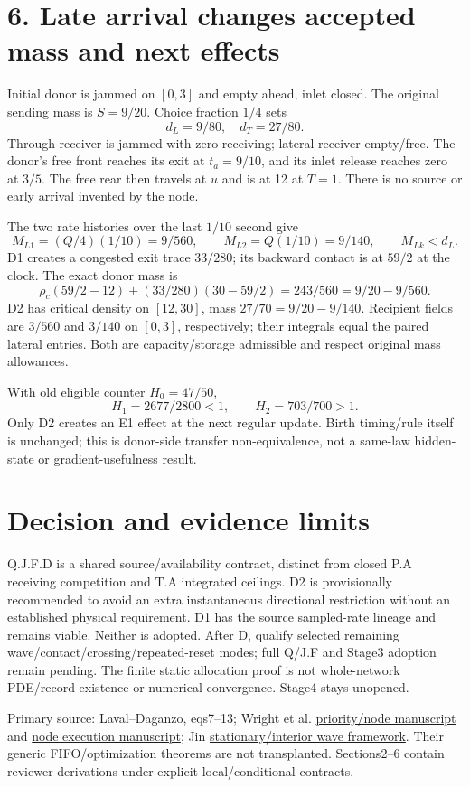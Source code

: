 \documentclass[11pt,a4paper]{article}
\begin{document}
\newpage
\section*{6. Late arrival changes accepted mass and next effects}
Initial donor is jammed on $[0,3]$ and empty ahead, inlet closed. The original
sending mass is $S=9/20$. Choice fraction $1/4$ sets
\begin{equation}
 d_L=9/80,\quad d_T=27/80.
\end{equation}
Through receiver is jammed with zero receiving; lateral receiver empty/free.
The donor's free front reaches its exit at $t_a=9/10$, and its inlet release
reaches zero at $3/5$. The free rear then travels at $u$ and is at 12 at
$T=1$. There is no source or early arrival invented by the node.

The two rate histories over the last $1/10$ second give
\begin{equation}
 M_{L1}=(Q/4)(1/10)=9/560,\qquad
 M_{L2}=Q(1/10)=9/140,
 \qquad M_{Lk}<d_L.
\end{equation}
D1 creates a congested exit trace $33/280$; its backward contact is at $59/2$
at the clock. The exact donor mass is
\begin{equation}
 \rho_c(59/2-12)+(33/280)(30-59/2)=243/560
 =9/20-9/560.
\end{equation}
D2 has critical density on $[12,30]$, mass $27/70=9/20-9/140$.
Recipient fields are $3/560$ and $3/140$ on $[0,3]$, respectively;
their integrals equal the paired lateral entries. Both are capacity/storage
admissible and respect original mass allowances.

With old eligible counter $H_0=47/50$,
\begin{equation}
 H_1=2677/2800<1,\qquad H_2=703/700>1.
\end{equation}
Only D2 creates an E1 effect at the next regular update. Birth timing/rule
itself is unchanged; this is donor-side transfer non-equivalence, not a
same-law hidden-state or gradient-usefulness result.

\section*{Decision and evidence limits}
Q.J.F.D is a shared source/availability contract, distinct from closed P.A
receiving competition and T.A integrated ceilings. D2 is provisionally
recommended to avoid an extra instantaneous directional restriction without
an established physical requirement. D1 has the source sampled-rate lineage
and remains viable. Neither is adopted. After D, qualify selected remaining
wave/contact/crossing/repeated-reset modes; full Q/J.F and Stage3 adoption
remain pending. The finite static allocation proof is not whole-network
PDE/record existence or numerical convergence. Stage4 stays unopened.

Primary source: Laval--Daganzo, eqs7--13; Wright et al.
\href{https://arxiv.org/pdf/1601.01054}{priority/node manuscript} and
\href{https://arxiv.org/pdf/1608.07623}{node execution manuscript}; Jin
\href{https://arxiv.org/pdf/1204.6727}{stationary/interior wave framework}.
Their generic FIFO/optimization theorems are not transplanted. Sections2--6
contain reviewer derivations under explicit local/conditional contracts.
\end{document}
